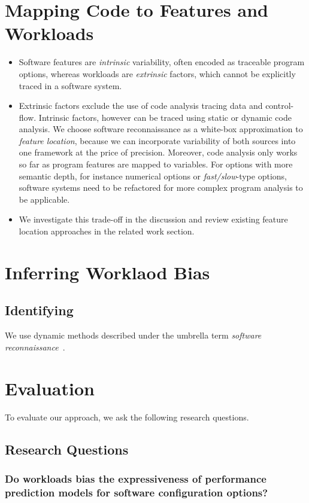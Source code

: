 \documentclass[conference]{IEEEtran}
\begin{document}
\section{Mapping Code to Features and Workloads}
\begin{itemize}
	\item Software features are \emph{intrinsic} variability, often encoded as traceable program options, whereas workloads are \emph{extrinsic} factors, which cannot be explicitly traced in a software system.
	\item Extrinsic factors exclude the use of code analysis tracing data and control-flow. Intrinsic factors, however can be traced using static or dynamic code analysis. 
	We choose software reconnaissance as a white-box approximation to \emph{feature location}, because we can incorporate variability of both sources into one framework at the price of precision. Moreover, code analysis only works so far as program features are mapped to variables. For options with more semantic depth, for instance numerical options or \emph{fast/slow}-type options, software systems need to be refactored for more complex program analysis to be applicable.
	\item We investigate this trade-off in the discussion and review existing feature location approaches in the related work section.
\end{itemize}


\section{Inferring Worklaod Bias}
\subsection{Identifying }
We use dynamic methods described under the umbrella term \emph{software reconnaissance}~\cite{wilde_reconnaissance_1995}.



\section{Evaluation}
To evaluate our approach, we ask the following research questions.

\subsection{Research Questions}

\subsubsection{Do workloads bias the expressiveness of performance prediction models for software configuration options?}
\end{document}
